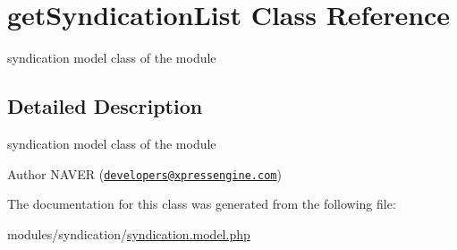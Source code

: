 \hypertarget{classgetSyndicationList}{\section{get\-Syndication\-List Class Reference}
\label{classgetSyndicationList}
}


syndication model class of the module  




\subsection{Detailed Description}
syndication model class of the module 

\begin{DoxyAuthor}{Author}
N\-A\-V\-E\-R (\href{mailto:developers@xpressengine.com}{\tt developers@xpressengine.\-com}) 
\end{DoxyAuthor}


The documentation for this class was generated from the following file\-:\begin{DoxyCompactItemize}
\item 
modules/syndication/\hyperlink{syndication_8model_8php}{syndication.\-model.\-php}\end{DoxyCompactItemize}
